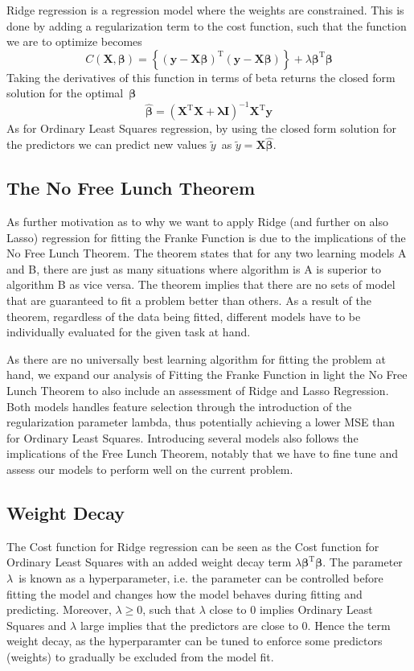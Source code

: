 \documentclass[11pt, a4paper]{article}
\begin{document}
Ridge regression is a regression model where the weights are constrained. \cite{Geron2019} This is done by adding a regularization term to the cost function, such that the function we are to optimize becomes
\[
  C\left(\bm{X},\bm{\beta}\right) = \left\{\left(\bm{y}-\bm{X}\bm{\beta}\right)^\text{T}\left(\bm{y}-\bm{X}\bm{\beta}\right)\right\}+\lambda\bm{\beta}^\text{T}\bm{\beta}
\]
Taking the derivatives of this function in terms of beta returns the closed form solution for the optimal $\bm{\beta}$
\[
  \bm{\hat{\beta}} = \left(\bm{X}^\text{T}\bm{X} + \bm{\lambda}\bm{I}\right)^{-1}\bm{X}^\text{T}\bm{y}
\]
As for Ordinary Least Squares regression, by using the closed form solution for the predictors we can predict new values $\tilde{y}$ as $\tilde{y} = \bm{X}\bm{\hat{\beta}}$.

\subsection*{The No Free Lunch Theorem}
As further motivation as to why we want to apply Ridge (and further on also Lasso) regression for fitting the Franke Function is due to the implications of the No Free Lunch Theorem. The theorem states that for any two learning models A and B, there are just as many situations where algorithm is A is superior to algorithm B as vice versa. \cite{Wolpert1996} The theorem implies that there are no sets of model that are guaranteed to fit a problem better than others. As a result of the theorem, regardless of the data being fitted, different models have to be individually evaluated for the given task at hand.

As there are no universally best learning algorithm for fitting the problem at hand, we expand our analysis of Fitting the Franke Function in light the No Free Lunch Theorem to also include an assessment of Ridge and Lasso Regression. Both models handles feature selection through the introduction of the regularization parameter lambda, thus potentially achieving a lower MSE than for Ordinary Least Squares. Introducing several models also follows the implications of the Free Lunch Theorem, notably that we have to fine tune and assess our models to perform well on the current problem. \cite{Goodfellow2016}

\subsection*{Weight Decay}
The Cost function for Ridge regression can be seen as the Cost function for Ordinary Least Squares with an added weight decay term $\lambda\bm{\beta}^\text{T}\bm{\beta}$. The parameter $\lambda$ is known as a hyperparameter, i.e. the parameter can be controlled before fitting the model and changes how the model behaves during fitting and predicting. \cite{Goodfellow2016} Moreover, $\lambda \geq 0$, such that $\lambda$ close to $0$ implies Ordinary Least Squares and $\lambda$ large implies that the predictors are close to $0$. Hence the term weight decay, as the hyperparamter can be tuned to enforce some predictors (weights) to gradually be excluded from the model fit.
\end{document}
